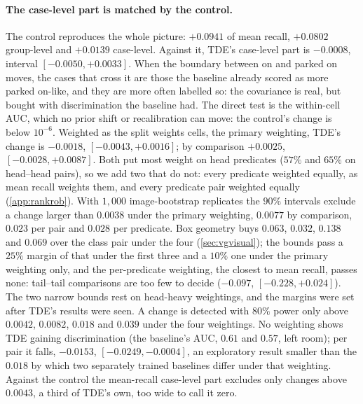 \paragraph{The case-level part is matched by the control.} The control reproduces the
whole picture: $+0.0941$ of mean recall, $+0.0802$ group-level and $+0.0139$ case-level.
Against it, TDE's case-level part is $-0.0008$, interval $[-0.0050,+0.0033]$. When the
boundary between \textsf{on} and \textsf{parked on} moves, the cases that cross it are those
the baseline already scored as more \textsf{parked on}-like, and they are more often labelled
so: the covariance is real, but bought with discrimination the baseline had. The direct test
is the within-cell AUC, which no prior shift or recalibration can move: the control's
change is below $10^{-6}$. Weighted as the split weights cells, the primary weighting, TDE's
change is $-0.0018$, $[-0.0043,+0.0016]$; by comparison $+0.0025$, $[-0.0028,+0.0087]$. Both
put most weight on head predicates ($57\%$ and $65\%$ on head--head pairs), so we add two that
do not: every predicate weighted equally, as mean recall weights them, and every predicate
pair weighted equally (\cref{app:rankrob}). With $1{,}000$ image-bootstrap replicates the
$90\%$ intervals exclude a change larger than $0.0038$ under the primary weighting, $0.0077$ by
comparison, $0.023$ per pair and $0.028$ per predicate. Box geometry buys $0.063$, $0.032$,
$0.138$ and $0.069$ over the class pair under the four (\cref{sec:vgvisual}); the bounds pass a
$25\%$ margin of that under the first three and a $10\%$ one under the primary weighting only,
and the per-predicate weighting, the closest to mean recall, passes none: tail--tail
comparisons are too few to decide ($-0.097$, $[-0.228,+0.024]$). The two narrow bounds rest on
head-heavy weightings, and the margins were set after TDE's results were seen. A change is
detected with $80\%$ power only above $0.0042$, $0.0082$, $0.018$ and $0.039$ under the four
weightings. No weighting shows TDE gaining discrimination (the baseline's AUC, $0.61$ and
$0.57$, left room); per pair
it falls, $-0.0153$, $[-0.0249,-0.0004]$, an exploratory result smaller than the $0.018$ by
which two separately trained baselines differ under that weighting. Against the control
the mean-recall case-level part excludes only changes above $0.0043$, a third of TDE's own,
too wide to call it zero.

